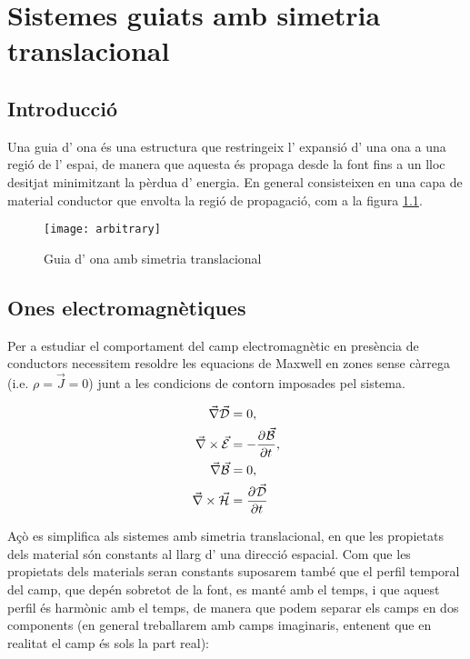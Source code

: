\chapter{Sistemes guiats amb simetria translacional}

\section{Introducció}

Una guia d' ona és una estructura que restringeix l' expansió d' una ona a una regió de l' espai, de manera que aquesta és propaga desde la font fins a un lloc desitjat minimitzant la pèrdua d' energia. En general consisteixen en una capa de material conductor que envolta la regió de propagació, com a la figura \cref{fig:waveguide}.

\begin{figure}[ht]
  \centering
  \texttt{[image: arbitrary]}
  \caption{Guia d' ona amb simetria translacional}
  \label{fig:waveguide}
\end{figure}

\section{Ones electromagnètiques}

Per a estudiar el comportament del camp electromagnètic en presència de conductors necessitem resoldre les equacions de Maxwell en zones sense càrrega (i.e. $\rho = \vec J = 0 $) junt a les condicions de contorn imposades pel sistema. 

\begin{subequations}
  \begin{align}
     \vec \nabla \vec{\mathcal{D}} &= 0, \label{ME1}\\
     \vec \nabla \times \vec{\mathcal{E}} &= - \frac{\partial ^{} \vec{\mathcal{B}}}{\partial t ^{}}, \label{ME2}\\
     \vec \nabla \vec{\mathcal{B}} &=0,  \label{ME3}\\
     \vec \nabla \times \vec{\mathcal{H}} &= \frac{\partial ^{} \vec{\mathcal{D}}}{\partial t ^{}} \label{ME4}
  \end{align}
\end{subequations}

Açò es simplifica als sistemes amb simetria translacional, en que les propietats dels material són constants al llarg d' una direcció espacial. Com que les propietats dels materials seran constants suposarem també que el perfil temporal del camp, que depén sobretot de la font, es manté amb el temps, i que aquest perfil és harmònic amb el temps, de manera que podem separar els camps en dos components (en general treballarem amb camps imaginaris, entenent que en realitat el camp és sols la part real):

